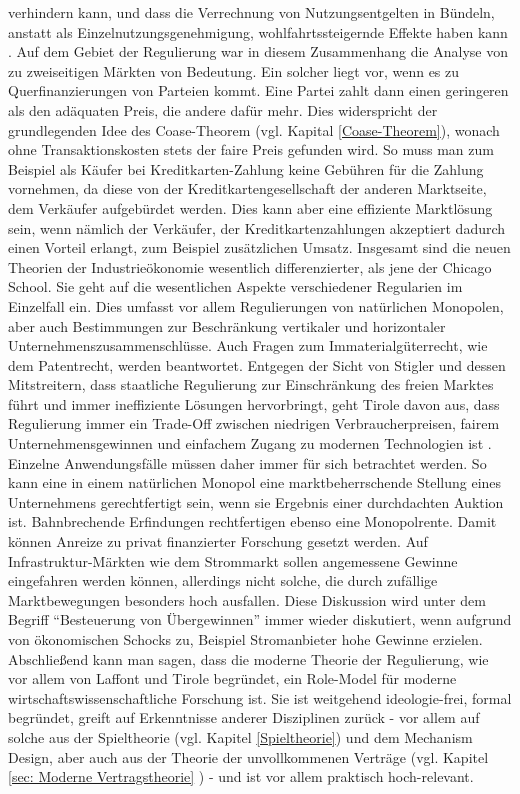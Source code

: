 verhindern kann, und dass die Verrechnung von Nutzungsentgelten in Bündeln, anstatt als Einzelnutzungsgenehmigung, wohlfahrtssteigernde Effekte haben kann \parencite[S. 4]{Haucap2014}. Auf dem Gebiet der Regulierung war in diesem Zusammenhang die Analyse von \textcite{Tirole2003, Tirole2006} zu zweiseitigen Märkten von Bedeutung. Ein solcher liegt vor, wenn es zu Querfinanzierungen von Parteien kommt. Eine Partei zahlt dann einen geringeren als den adäquaten Preis, die andere dafür mehr. Dies widerspricht der grundlegenden Idee des Coase-Theorem (vgl. Kapital \ref{Coase-Theorem}), wonach ohne Transaktionskosten stets der faire Preis gefunden wird. So muss man zum Beispiel als Käufer bei Kreditkarten-Zahlung keine Gebühren für die Zahlung vornehmen, da diese von der Kreditkartengesellschaft der anderen Marktseite, dem Verkäufer aufgebürdet werden.  Dies kann aber eine effiziente Marktlösung sein, wenn nämlich der Verkäufer, der Kreditkartenzahlungen akzeptiert dadurch einen Vorteil erlangt, zum Beispiel zusätzlichen Umsatz.
Insgesamt sind die neuen Theorien der Industrieökonomie wesentlich differenzierter, als jene der Chicago School. Sie geht auf die wesentlichen Aspekte verschiedener Regularien im Einzelfall ein. Dies umfasst vor allem Regulierungen von natürlichen Monopolen, aber auch Bestimmungen zur Beschränkung vertikaler und horizontaler Unternehmenszusammenschlüsse. Auch Fragen zum Immaterialgüterrecht, wie dem Patentrecht, werden beantwortet. Entgegen der Sicht von Stigler und dessen Mitstreitern, dass staatliche Regulierung zur Einschränkung des freien Marktes führt und immer ineffiziente Lösungen hervorbringt, geht Tirole davon aus, dass Regulierung immer ein Trade-Off zwischen niedrigen Verbraucherpreisen, fairem Unternehmensgewinnen und einfachem Zugang zu modernen Technologien ist \parencite[S. 509]{Tirole2014}. Einzelne Anwendungsfälle müssen daher immer für sich betrachtet werden. So kann eine in einem natürlichen Monopol eine marktbeherrschende Stellung eines Unternehmens gerechtfertigt sein, wenn sie Ergebnis einer durchdachten Auktion ist. Bahnbrechende Erfindungen rechtfertigen ebenso eine Monopolrente. Damit können Anreize zu privat finanzierter Forschung gesetzt werden. Auf Infrastruktur-Märkten wie dem Strommarkt sollen angemessene Gewinne eingefahren werden können, allerdings nicht solche, die durch zufällige Marktbewegungen besonders hoch ausfallen. Diese Diskussion wird unter dem Begriff "`Besteuerung von Übergewinnen"' immer wieder diskutiert, wenn aufgrund von ökonomischen Schocks zu, Beispiel Stromanbieter hohe Gewinne erzielen. Abschließend kann man sagen, dass die moderne Theorie der Regulierung, wie vor allem von Laffont und Tirole begründet, ein Role-Model für moderne wirtschaftswissenschaftliche Forschung ist. Sie ist weitgehend ideologie-frei,  formal begründet, greift auf Erkenntnisse anderer Disziplinen zurück - vor allem auf solche aus der Spieltheorie (vgl. Kapitel \ref{Spieltheorie}) und dem Mechanism Design, aber auch aus der  Theorie der unvollkommenen Verträge (vgl. Kapitel \ref{sec: Moderne Vertragstheorie} ) - und ist vor allem praktisch hoch-relevant.